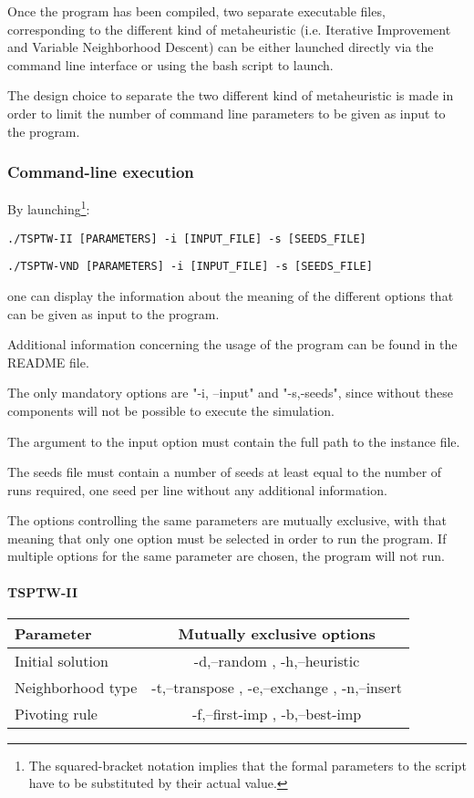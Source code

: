 \documentclass{article}
\begin{document}
Once the program has been compiled, two separate executable files,
corresponding to the different kind of metaheuristic (i.e. Iterative Improvement
and Variable Neighborhood Descent) can be either launched directly via the command line
interface or using the bash script to launch.

The design choice to separate the two different kind of metaheuristic is made in order to limit the number of command line parameters to be given as input to the program.

\subsubsection{Command-line execution}
By launching\footnote{The squared-bracket notation implies that the formal parameters to the script have to be substituted by their actual value.}:
\begin{center}
\begin{verbatim}
./TSPTW-II [PARAMETERS] -i [INPUT_FILE] -s [SEEDS_FILE]
\end{verbatim}
\begin{verbatim}
./TSPTW-VND [PARAMETERS] -i [INPUT_FILE] -s [SEEDS_FILE]
\end{verbatim}
\end{center}

one can display the information about the meaning of the different options that can be given as input to the program.

Additional information concerning the usage of the program can be found in the README file.

The only mandatory options are "-i, --input" and "-s,-seeds", since
without these components will not be possible to execute the simulation.

The argument to the input option must contain the full path to the instance file.

The seeds file must contain a number of seeds at least equal to the number of
runs required, one seed per line without any additional information.

The options controlling the same parameters are mutually exclusive, with that
meaning that only one option must be selected in order to run the program.
If multiple options for the same parameter are chosen, the program will not
run.

\paragraph{TSPTW-II}
\begin{tabular}{|l|c|}
\hline
\textbf{Parameter}	&	\textbf{Mutually exclusive options} \\ \hline
Initial solution & -d,--random , -h,--heuristic \\ \hline
Neighborhood type &-t,--transpose , -e,--exchange , -n,--insert \\ \hline 
Pivoting rule &	-f,--first-imp , -b,--best-imp \\ \hline
\end{tabular}
\end{document}
